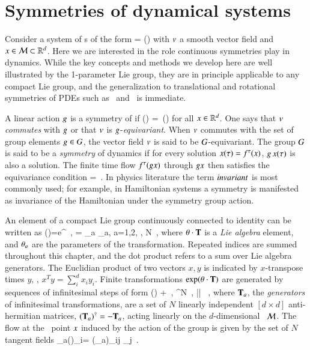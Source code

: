\documentclass[preprint,number,sort&compress]{elsarticle}
\begin{document}
\section{\label{s:symDyn} Symmetries of dynamical systems}

Consider a system of \ode s of the form
\beq
	\dot{\ssp} = \vf(\ssp)
	\label{eq:difeq}
\eeq
with $v$ a smooth vector field and $x\in{\cal M}\subset\mathbb{R}^{d}$.
Here we are interested in the role continuous symmetries
play in dynamics.
While the key concepts and methods we develop here are well
illustrated by the 1-parameter Lie  group, they are in
principle applicable to any compact Lie group, and the
generalization to translational and rotational symmetries of
PDEs such as \KS\ and \pCf\ is immediate.

A linear action $g$ is a symmetry of
 if
\beq
	\vf(\LieEl \ssp) =\LieEl \, \vf(\ssp)
	\label{eq:equiv}
\eeq
for all $x\in\mathbb{R}^{d}$. One  says that $v$ \emph{commutes}
with $g$ or that $v$ is $g$-\emph{equi\-vari\-ant}.
When $v$ commutes with the set of group elements
$g\in G$, the vector field $v$ is said to be
$G$-equi\-vari\-ant. The group $G$ is said to be a {\em
symmetry} of dynamics if for every solution $x(\tau)=
{f^{\tau}(x)}$, $g \, x(\tau)$ is also a solution. The finite
time flow ${f^{\tau}(g x)}$ through $g x$ then
satisfies the equivariance condition
\beq
\flow{\tau}{\LieEl \ssp}=\LieEl\flow{\tau}{\ssp}
\,.
In physics literature the term $in\-vari\-ant$ is most commonly
used; for example, in Hamiltonian systems a symmetry is
manifested as invariance of the Hamiltonian under the
symmetry group action.

An element of a compact Lie group
continuously connected to identity can be written as
\beq
\LieEl(\gSpace)=e^{\gSpace \cdot \Lg }
	\,,\qquad
\gSpace \cdot \Lg  = \sum \gSpace_a \Lg_a,\; a=1,2, \cdots, N
\,,
where
${\bf \theta} \cdot \mathbf{T}$
is a {\em Lie algebra} element,  and ${\bf \theta}_a$ are the parameters
of the transformation. Repeated indices are summed throughout this
chapter, and the dot product refers to a sum over
Lie algebra generators. The Euclidian product of two vectors
$x,y$ is indicated by $x$-transpose times $y$, \ie,
$x^T y = \sum_i^d x_i y_i$.
Finite transformations $ \exp({\bf \theta} \cdot {\ensuremath{\mathbf{T}}}) $ are
generated by sequences of infinitesimal steps of form
\beq
\LieEl(\delta\gSpace)  + \delta \gSpace \cdot \Lg
    \,,\quad
\delta\gSpace \in \reals^N
    \,,\quad
|\delta \gSpace| 
    \, ,
where $\mathbf{T}_a$, the {\em generators} of infinitesimal
transformations, are a set of $N$ linearly independent
$[d\!\times\!d]$ anti-hermitian matrices, $(\mathbf{T}_a)^\dagger =
- \mathbf{T}_a$, acting linearly on the $d$-dim\-ens\-ion\-al \statesp\
${\cal M}$.
The flow
at the \statesp\ point $x$ induced by the action of the group
is given by the set of $N$ tangent fields
\beq
\groupTan_a(\ssp)_{i}= (\Lg_a){}_{ij} \ssp_j
\,.
\end{document}
